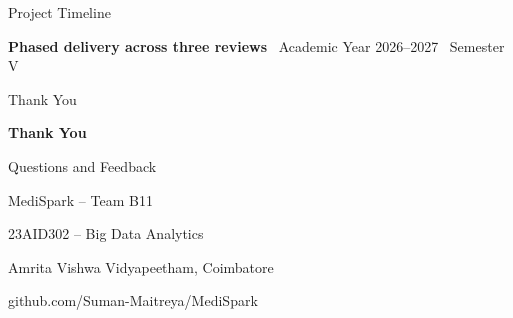 \documentclass[aspectratio=169, 11pt]{beamer}
\begin{document}
\begin{frame}{Project Timeline}
\vspace{0.3cm}
\begin{center}
  \colorbox{msLight}{\parbox{0.75\textwidth}{\centering\small
    \textcolor{msNavy}{\textbf{Phased delivery across three reviews} \textbar\ Academic Year 2026--2027 \textbar\ Semester V}
  }}
\end{center}

\end{frame}

\begin{frame}{Thank You}

\vspace{1.5cm}
\begin{center}
  {\Huge\bfseries\textcolor{msNavy}{Thank You}}

  \vspace{0.5cm}
  {\large\textcolor{msTeal}{Questions and Feedback}}

  \vspace{1.0cm}
  {\small\textcolor{msGray}{MediSpark -- Team B11}}

  \vspace{0.15cm}
  {\small\textcolor{msGray}{23AID302 -- Big Data Analytics}}

  \vspace{0.15cm}
  {\small\textcolor{msGray}{Amrita Vishwa Vidyapeetham, Coimbatore}}

  \vspace{0.5cm}
  {\footnotesize\textcolor{msTeal}{github.com/Suman-Maitreya/MediSpark}}
\end{center}
\end{frame}
\end{document}
